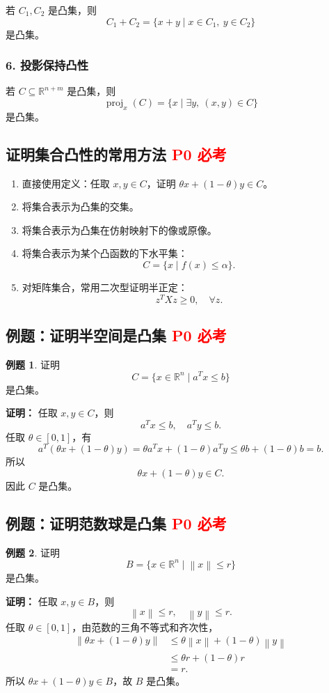 \documentclass[11pt,a4paper]{ctexart}
\newcommand{\R}{\mathbb{R}}
\newcommand{\proj}{\operatorname{proj}}
\newcommand{\norm}[1]{\left\lVert #1 \right\rVert}
\newcommand{\Pzero}{\textcolor{red}{\textbf{P0 必考}}}
\theoremstyle{definition}
\newtheorem{example}{例题}[section]
\theoremstyle{plain}
\theoremstyle{remark}
\begin{document}
若 $C_1,C_2$ 是凸集，则
\[
    C_1+C_2
    =
    \{x+y\mid x\in C_1,\ y\in C_2\}
\]
是凸集。

\subsubsection*{6. 投影保持凸性}

若 $C\subseteq\R^{n+m}$ 是凸集，则
\[
    \proj_x(C)=\{x\mid \exists y,\ (x,y)\in C\}
\]
是凸集。

\subsection{证明集合凸性的常用方法 \Pzero}

\begin{enumerate}[label=\arabic*.]
    \item 直接使用定义：任取 $x,y\in C$，证明 $\theta x+(1-\theta)y\in C$。
    \item 将集合表示为凸集的交集。
    \item 将集合表示为凸集在仿射映射下的像或原像。
    \item 将集合表示为某个凸函数的下水平集：
    \[
        C=\{x\mid f(x)\le \alpha\}.
    \]
    \item 对矩阵集合，常用二次型证明半正定：
    \[
        z^T X z\ge0,\quad \forall z.
    \]
\end{enumerate}

\subsection{例题：证明半空间是凸集 \Pzero}

\begin{example}
证明
\[
    C=\{x\in\R^n\mid a^Tx\le b\}
\]
是凸集。

\textbf{证明：}
任取 $x,y\in C$，则
\[
    a^Tx\le b,\quad a^Ty\le b.
\]
任取 $\theta\in[0,1]$，有
\[
    a^T(\theta x+(1-\theta)y)
    =
    \theta a^Tx+(1-\theta)a^Ty
    \le
    \theta b+(1-\theta)b=b.
\]
所以
\[
    \theta x+(1-\theta)y\in C.
\]
因此 $C$ 是凸集。
\end{example}

\subsection{例题：证明范数球是凸集 \Pzero}

\begin{example}
证明
\[
    B=\{x\in\R^n\mid \norm{x}\le r\}
\]
是凸集。

\textbf{证明：}
任取 $x,y\in B$，则
\[
    \norm{x}\le r,\quad \norm{y}\le r.
\]
任取 $\theta\in[0,1]$，由范数的三角不等式和齐次性，
\[
\begin{aligned}
    \norm{\theta x+(1-\theta)y}
    &\le
    \theta\norm{x}+(1-\theta)\norm{y}\\
    &\le
    \theta r+(1-\theta)r\\
    &=r.
\end{aligned}
\]
所以 $\theta x+(1-\theta)y\in B$，故 $B$ 是凸集。
\end{example}
\end{document}
